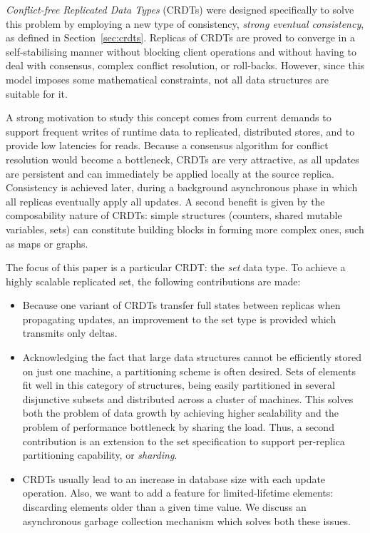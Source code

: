 \textit{Conflict-free Replicated Data Types} (CRDTs) were designed specifically
to solve this problem by employing a new type of consistency, \textit{strong
eventual consistency}, as defined in Section~\ref{sec:crdts}. Replicas of CRDTs
are proved to converge in a self-stabilising manner without blocking client
operations and without having to deal with consensus, complex conflict
resolution, or roll-backs. However, since this model imposes some mathematical
constraints, not all data structures are suitable for it.

A strong motivation to study this concept comes from current demands to support
frequent writes of runtime data to replicated, distributed stores, and to
provide low latencies for reads. Because a consensus algorithm for conflict
resolution would become a bottleneck, CRDTs are very attractive, as all updates
are persistent and can immediately be applied locally at the source replica.
Consistency is achieved later, during a background asynchronous phase in which
all replicas eventually apply all updates. A second benefit is given by the
composability nature of CRDTs: simple structures (counters, shared mutable
variables, sets) can constitute building blocks in forming more complex ones,
such as maps or graphs.

The focus of this paper is a particular CRDT: the \textit{set} data type. To
achieve a highly scalable replicated set, the following contributions are made:
\begin{itemize}
  \item Because one variant of CRDTs transfer full states between replicas when
  propagating updates, an improvement to the set type is provided which
  transmits only deltas.
  \item Acknowledging the fact that large data structures cannot be efficiently
  stored on just one machine, a partitioning scheme is often desired. Sets of
  elements fit well in this category of structures, being easily partitioned in
  several disjunctive subsets and distributed across a cluster of machines.
  This solves both the problem of data growth by achieving higher scalability
  and the problem of performance bottleneck by sharing the load. Thus, a second
  contribution is an extension to the set specification to support per-replica
  partitioning capability, or \textit{sharding}.
  \item CRDTs usually lead to an increase in database size with each update
  operation. Also, we want to add a feature for limited-lifetime elements:
  discarding elements older than a given time value. We discuss an asynchronous
  garbage collection mechanism which solves both these issues.
\end{itemize}